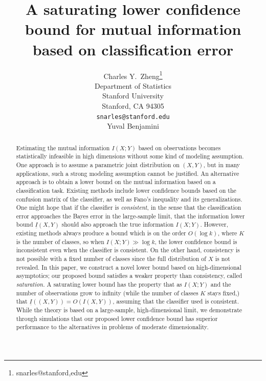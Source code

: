 \documentclass{article}
\title{A saturating lower confidence bound for mutual information based on classification error}
\author{
  Charles Y.~Zheng\thanks{snarles@stanford,edu} \\
  Department of Statistics\\
  Stanford University\\
  Stanford, CA 94305 \\
  \texttt{snarles@stanford.edu} \\
  \And
  Yuval Benjamini \\
}
\begin{document}

\maketitle

\begin{abstract}
Estimating the mutual information $I(X; Y)$ based on observations becomes statistically infeasible in high
dimensions without some kind of modeling assumption.  One approach is to assume a parametric joint distribution on $(X, Y)$, but in many applications, such a strong modeling assumption cannot be justified.
An alternative approach is to obtain a lower bound on the mutual information based on a classification task.
Existing methods include lower confidence bounds based on the confusion matrix of the classifier, as well as
Fano's inequality and its generalizations.  One might hope that if the classifier is \emph{consistent}, in the sense that the classification error approaches the Bayes error in the large-sample limit, that the information lower bound $\underline{I}(X, Y)$ should also approach the true information $I(X; Y)$.  However, existing methods always produce a bound which is on the order $O(\log k)$, where $K$ is the number of classes, so when $I(X; Y) \gg \log k$, the lower confidence bound is inconsistent even when the classifier is consistent.  On the other hand, consistency is not possible with a fixed number of classes since the full distribution of $X$ is not revealed.  In this paper, we construct a novel lower bound based on high-dimensional asymptotics; our proposed bound satisfies a weaker property than consistency, called \emph{saturation.}  A saturating lower bound has the property that as $I(X; Y)$ and the number of observations grow to infinity (while the number of classes $K$ stays fixed,) that $\underline{I}((X, Y)) = O(I(X, Y))$, assuming that the classifier used is consistent. %
While the theory is based on a large-sample, high-dimensional limit, we demonstrate through simulations that our proposed lower confidence bound has superior performance to the alternatives in problems of moderate dimensionality.
\end{abstract}
\end{document}

